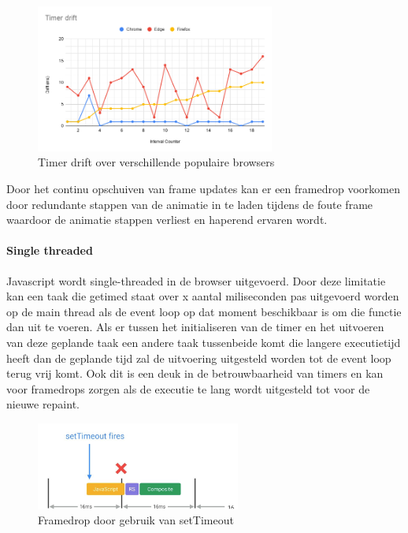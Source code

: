 \begin{figure}[H]
\centering
\includegraphics[width=0.7\textwidth]{img/Timer drift.png}
\caption{Timer drift over verschillende populaire browsers} \label{drift}
\end{figure}

Door het continu opschuiven van frame updates kan er een framedrop voorkomen door redundante stappen van de animatie in te laden tijdens de foute frame waardoor de animatie stappen verliest en haperend ervaren wordt.

\paragraph{Single threaded}
Javascript wordt single-threaded in de browser uitgevoerd. Door deze limitatie kan een taak die getimed staat over x aantal miliseconden pas uitgevoerd worden op de main thread als de event loop op dat moment beschikbaar is om die functie dan uit te voeren. Als er tussen het initialiseren van de timer en het uitvoeren van deze geplande taak een andere taak tussenbeide komt die langere executietijd heeft dan de geplande tijd zal de uitvoering uitgesteld worden tot de event loop terug vrij komt. Ook dit is een deuk in de betrouwbaarheid van timers en kan voor framedrops zorgen als de executie te lang wordt uitgesteld tot voor de nieuwe repaint.

\begin{figure}[H]
	\centering
	\includegraphics[width=0.6\textwidth]{img/drift-framedrop.png}
	\caption{Framedrop door gebruik van setTimeout} \label{drift-framedrop}
\end{figure}

